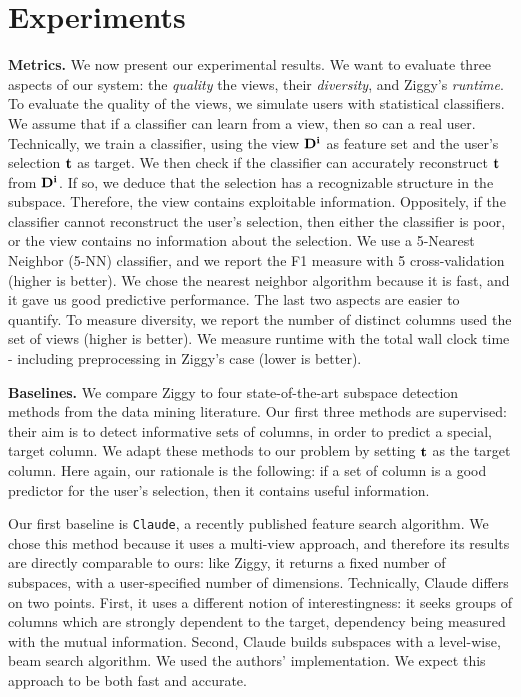 \section{Experiments}
\label{sec:experiments}



\textbf{Metrics.} We now present our experimental results. We want to evaluate three aspects of
our system: the \emph{quality} the views, their \emph{diversity}, and Ziggy's
\emph{runtime}. To evaluate the quality of the views, we simulate users with
statistical classifiers. We assume that if a classifier can learn from a view,
then so can a real user. Technically, we train a classifier, using the view
$\bf{D}^i$ as feature set and the user's selection $\bf{t}$ as target. We then
check if the classifier can accurately reconstruct $\bf{t}$ from $\bf{D}^i$. If
so, we deduce that the selection has a recognizable structure in the subspace.
Therefore, the view contains exploitable information. Oppositely, if the
classifier cannot reconstruct the user's selection, then either the classifier
is poor, or the view contains no information about the selection. We use a
5-Nearest Neighbor (5-NN) classifier, and we report the F1 measure with 5
cross-validation (higher is better). We chose the nearest neighbor algorithm
because it is fast, and it gave us good predictive performance. The last two
aspects are easier to quantify. To measure diversity, we report the number of
distinct columns used the set of views (higher is better). We measure runtime
with the total wall clock time - including preprocessing in Ziggy's case (lower is better).

\textbf{Baselines.} We compare Ziggy to four state-of-the-art subspace detection methods from the
data mining literature. Our first three methods are supervised: their aim is to
detect informative sets of columns, in order to predict a special, target
column. We adapt these methods to our problem by setting $\bf{t}$ as the target
column. Here again, our rationale is the following: if a set of column is a good
predictor for the user's selection, then it contains useful information.

Our first baseline is \texttt{Claude}, a recently published feature search
algorithm. We chose this method because it uses a multi-view approach, and
therefore its results are directly comparable to ours: like Ziggy, it returns a
fixed number of subspaces, with a user-specified number of dimensions.
Technically, Claude differs on two points. First, it uses a different notion of
interestingness: it seeks groups of columns which are strongly dependent to the
target, dependency being measured with the mutual information. Second, Claude
builds subspaces with a level-wise, beam search algorithm. We used the authors'
implementation.  We expect this approach to be both fast and accurate.

